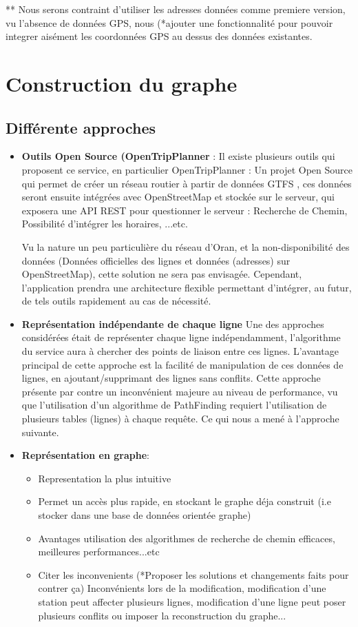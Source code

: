 	** Nous serons contraint d'utiliser les adresses données comme premiere version, vu l'absence de données GPS, nous (*ajouter une fonctionnalité pour pouvoir integrer aisément les coordonnées GPS au dessus des données existantes.


	\section{Construction du graphe}
	\subsection{Différente approches}
	\begin{itemize}
	\item \textbf{Outils Open Source (OpenTripPlanner} : 
		Il existe plusieurs outils qui proposent ce service, en particulier OpenTripPlanner : Un projet Open Source qui permet de créer un réseau routier à partir de données GTFS , ces données seront ensuite intégrées avec OpenStreetMap et stockée sur le serveur, qui exposera une API REST pour questionner le serveur : Recherche de Chemin, Possibilité d'intégrer les horaires, ...etc.
		
		Vu la nature un peu particulière du réseau d'Oran, et la non-disponibilité des données (Données officielles des lignes et données (adresses) sur OpenStreetMap), cette solution ne sera pas envisagée. 
		Cependant, l'application prendra une architecture flexible permettant d'intégrer, au futur, de tels outils rapidement au cas de nécessité.
	\item \textbf{Représentation indépendante de chaque ligne}
	Une des approches considérées était de représenter chaque ligne indépendamment, l'algorithme du service aura à chercher des points de liaison entre ces lignes.
	L'avantage principal de cette approche est la facilité de manipulation de ces données de lignes, en ajoutant/supprimant des lignes sans conflits.
	Cette approche présente par contre un inconvénient majeure au niveau de performance, vu que l'utilisation d'un algorithme de PathFinding requiert l'utilisation de plusieurs tables (lignes) à chaque requête. Ce qui nous a mené à l'approche suivante.
	\item \textbf{Représentation en graphe}:
	
	\begin{itemize}
	\item Representation la plus intuitive
	\item Permet un accès plus rapide, en stockant le graphe déja construit (i.e stocker dans une base de données orientée graphe)
	\item Avantages utilisation des algorithmes de recherche de chemin efficaces, meilleures performances...etc
	\item Citer les inconvenients (*Proposer les solutions et changements faits pour contrer ça) Inconvénients lors de la modification, modification d'une station peut affecter plusieurs lignes, modification d'une ligne peut poser plusieurs conflits ou imposer la reconstruction du graphe...
	\end{itemize}

	\end{itemize}
